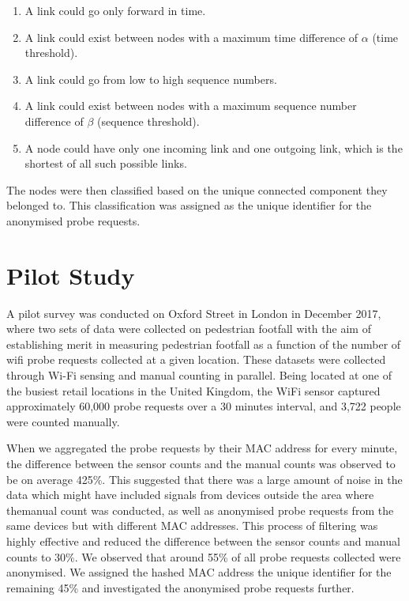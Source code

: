\documentclass[11t, a4paper, twocolumn]{article}
\begin{document}
			\begin{enumerate}
				\item A link could go only forward in time. 
				\item A link could exist between nodes with a maximum time difference of $\alpha$ (time threshold).
				\item A link could go from low to high sequence numbers.
				\item A link could exist between nodes with a maximum sequence number difference of $\beta$ (sequence threshold).
				\item A node could have only one incoming link and one outgoing link, which is the shortest of all such possible links.
			\end{enumerate}

		The nodes were then classified based on the unique connected component they belonged to.
		This classification was assigned as the unique identifier for the anonymised probe requests.

	\section{Pilot Study}\label{data}
		A pilot survey was conducted on Oxford Street in London in December 2017, where two sets of data were collected on pedestrian footfall with the aim of establishing merit in measuring pedestrian footfall as a function of the number of wifi probe requests collected at a given location.
		These datasets were collected through Wi-Fi sensing and manual counting in parallel.
		Being located at one of the busiest retail locations in the United Kingdom, the WiFi sensor captured approximately 60,000 probe requests over a 30 minutes interval, and 3,722 people were counted manually.
		
		When we aggregated the probe requests by their MAC address for every minute, the difference between the sensor counts and the manual counts was observed to be on average 425\%.
		This suggested that there was a large amount of noise in the data which might have included signals from devices outside the area where themanual count was conducted, as well as anonymised probe requests from the same devices but with different MAC addresses.
		This process of filtering was highly effective and reduced the difference between the sensor counts and manual counts to 30\%.
		We observed that around 55\% of all probe requests collected were anonymised.
		We assigned the hashed MAC address the unique identifier for the remaining 45\% and investigated the anonymised probe requests further.
	
\end{document}

